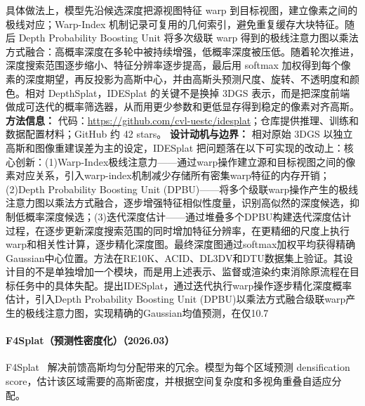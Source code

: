 具体做法上，模型先沿候选深度把源视图特征 warp 到目标视图，建立像素之间的极线对应；Warp-Index 机制记录可复用的几何索引，避免重复缓存大块特征。随后 Depth Probability Boosting Unit 将多次级联 warp 得到的极线注意力图以乘法方式融合：高概率深度在多轮中被持续增强，低概率深度被压低。随着轮次推进，深度搜索范围逐步缩小、特征分辨率逐步提高，最后用 softmax 加权得到每个像素的深度期望，再反投影为高斯中心，并由高斯头预测尺度、旋转、不透明度和颜色。相对 DepthSplat，IDESplat 的关键不是换掉 3DGS 表示，而是把深度前端做成可迭代的概率筛选器，从而用更少参数和更低显存得到稳定的像素对齐高斯。\textbf{方法信息：} 代码：\url{https://github.com/cvl-uestc/idesplat}；仓库提供推理、训练和数据配置材料；GitHub 约 42 stars。
\textbf{设计动机与边界：} 相对原始 3DGS 以独立高斯和图像重建误差为主的设定，IDESplat 把问题落在以下可实现的改动上：核心创新：(1)Warp-Index极线注意力——通过warp操作建立源和目标视图之间的像素对应关系，引入warp-index机制减少存储所有密集warp特征的内存开销；(2)Depth Probability Boosting Unit (DPBU)——将多个级联warp操作产生的极线注意力图以乘法方式融合，逐步增强特征相似性度量，识别高似然的深度候选，抑制低概率深度候选；(3)迭代深度估计——通过堆叠多个DPBU构建迭代深度估计过程，在逐步更新深度搜索范围的同时增加特征分辨率，在更精细的尺度上执行warp和相关性计算，逐步精化深度图。最终深度图通过softmax加权平均获得精确Gaussian中心位置。方法在RE10K、ACID、DL3DV和DTU数据集上验证。其设计目的不是单独增加一个模块，而是用上述表示、监督或渲染约束消除原流程在目标任务中的具体失配。提出IDESplat，通过迭代执行warp操作逐步精化深度概率估计，引入Depth Probability Boosting Unit (DPBU)以乘法方式融合级联warp产生的极线注意力图，实现精确的Gaussian均值预测，在仅10.7%
\paragraph{F4Splat（预测性密度化）（2026.03）}
F4Splat~\cite{2603_21304} 解决前馈高斯均匀分配带来的冗余。模型为每个区域预测 densification score，估计该区域需要的高斯密度，并根据空间复杂度和多视角重叠自适应分配。

